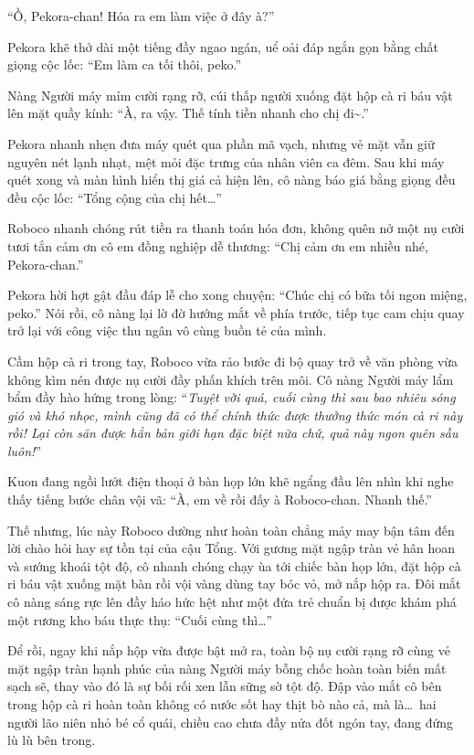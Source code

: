 \documentclass[../main.tex]{subfiles}
\begin{document}
``Ồ, Pekora-chan! Hóa ra em làm việc ở đây à?''


Pekora khẽ thở dài một tiếng đầy ngao ngán, uể oải đáp ngắn gọn bằng chất giọng cộc lốc: ``Em làm ca tối thôi, peko.''

Nàng Người máy mỉm cười rạng rỡ, cúi thấp người xuống đặt hộp cà ri báu vật lên mặt quầy kính: ``À, ra vậy. Thế tính tiền nhanh cho chị đi\~{}.''

Pekora nhanh nhẹn đưa máy quét qua phần mã vạch, nhưng vẻ mặt vẫn giữ nguyên nét lạnh nhạt, mệt mỏi đặc trưng của nhân viên ca đêm. Sau khi máy quét xong và màn hình hiển thị giá cả hiện lên, cô nàng báo giá bằng giọng đều đều cộc lốc: ``Tổng cộng của chị hết\dots''

Roboco nhanh chóng rút tiền ra thanh toán hóa đơn, không quên nở một nụ cười tươi tắn cảm ơn cô em đồng nghiệp dễ thương: ``Chị cảm ơn em nhiều nhé, Pekora-chan.''

Pekora hời hợt gật đầu đáp lễ cho xong chuyện: ``Chúc chị có bữa tối ngon miệng, peko.'' Nói rồi, cô nàng lại lờ đờ hướng mắt về phía trước, tiếp tục cam chịu quay trở lại với công việc thu ngân vô cùng buồn tẻ của mình.

Cầm hộp cà ri trong tay, Roboco vừa rảo bước đi bộ quay trở về văn phòng vừa không kìm nén được nụ cười đầy phấn khích trên môi. Cô nàng Người máy lẩm bẩm đầy hào hứng trong lòng: ``\textit{Tuyệt vời quá, cuối cùng thì sau bao nhiêu sóng gió và khó nhọc, mình cũng đã có thể chính thức được thưởng thức món cà ri này rồi! Lại còn săn được hẳn bản giới hạn đặc biệt nữa chứ, quả này ngon quên sầu luôn!}''

\ct

Kuon đang ngồi lướt điện thoại ở bàn họp lớn khẽ ngẩng đầu lên nhìn khi nghe thấy tiếng bước chân vội vã: ``À, em về rồi đấy à Roboco-chan. Nhanh thế.''

Thế nhưng, lúc này Roboco dường như hoàn toàn chẳng mảy may bận tâm đến lời chào hỏi hay sự tồn tại của cậu Tổng. Với gương mặt ngập tràn vẻ hân hoan và sướng khoái tột độ, cô nhanh chóng chạy ùa tới chiếc bàn họp lớn, đặt hộp cà ri báu vật xuống mặt bàn rồi vội vàng dùng tay bóc vỏ, mở nắp hộp ra. Đôi mắt cô nàng sáng rực lên đầy háo hức hệt như một đứa trẻ chuẩn bị được khám phá một rương kho báu thực thụ: ``Cuối cùng thì\dots''

Để rồi, ngay khi nắp hộp vừa được bật mở ra, toàn bộ nụ cười rạng rỡ cùng vẻ mặt ngập tràn hạnh phúc của nàng Người máy bỗng chốc hoàn toàn biến mất sạch sẽ, thay vào đó là sự bối rối xen lẫn sững sờ tột độ. Đập vào mắt cô bên trong hộp cà ri hoàn toàn không có nước sốt hay thịt bò nào cả, mà là\dots\ hai người lão niên nhỏ bé cổ quái, chiều cao chưa đầy nửa đốt ngón tay, đang đứng lù lù bên trong.
\end{document}

